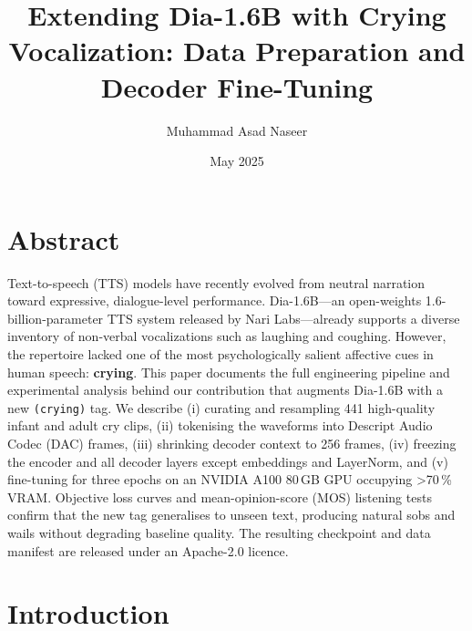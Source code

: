 \documentclass{article}
\title{Extending Dia-1.6B with Crying Vocalization: Data Preparation and Decoder Fine-Tuning}
\author[1]{Muhammad Asad Naseer} %
\affil[1]{\emph{Nari Labs}} %
\date{May 2025} %
\begin{document}
\maketitle

\clearpage

\hypertarget{abstract}{%
\section*{Abstract}\label{abstract}}

Text-to-speech (TTS) models have recently evolved from neutral narration
toward expressive, dialogue-level performance. Dia-1.6B---an
open-weights 1.6-billion-parameter TTS system released by
Nari Labs---already supports a diverse inventory of non-verbal
vocalizations such as laughing and coughing. However, the repertoire
lacked one of the most psychologically salient affective cues in human
speech: \textbf{crying}. This paper documents the full engineering
pipeline and experimental analysis behind our contribution that augments
Dia-1.6B with a new \texttt{(crying)} tag. We describe (i) curating and
resampling 441 high-quality infant and adult cry clips, (ii) tokenising
the waveforms into Descript Audio Codec (DAC) frames, (iii) shrinking
decoder context to 256 frames, (iv) freezing the encoder and all decoder
layers except embeddings and LayerNorm, and (v) fine-tuning for three
epochs on an NVIDIA A100 80\,GB GPU occupying \textgreater 70\,\% VRAM.
Objective loss curves and mean-opinion-score (MOS) listening tests
confirm that the new tag generalises to unseen text, producing natural
sobs and wails without degrading baseline quality. The resulting
checkpoint and data manifest are released under an Apache-2.0 licence.


\hypertarget{introduction}{%
\section{Introduction}\label{introduction}}
\end{document}
